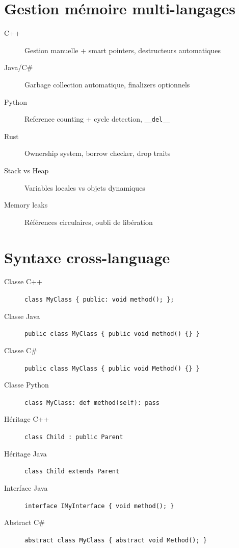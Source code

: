 \documentclass{article}
\begin{document}
\begin{multicols*}{3}
\section*{Gestion mémoire multi-langages}
\begin{description}
\item[C++] Gestion manuelle + smart pointers, destructeurs automatiques
\item[Java/C\#] Garbage collection automatique, finalizers optionnels
\item[Python] Reference counting + cycle detection, \texttt{\_\_del\_\_}
\item[Rust] Ownership system, borrow checker, drop traits
\item[Stack vs Heap] Variables locales vs objets dynamiques
\item[Memory leaks] Références circulaires, oubli de libération
\end{description}

\section*{Syntaxe cross-language}
\begin{description}
\item[Classe C++] \texttt{class MyClass \{ public: void method(); \};}
\item[Classe Java] \texttt{public class MyClass \{ public void method() \{\} \}}
\item[Classe C\#] \texttt{public class MyClass \{ public void Method() \{\} \}}
\item[Classe Python] \texttt{class MyClass: def method(self): pass}
\item[Héritage C++] \texttt{class Child : public Parent}
\item[Héritage Java] \texttt{class Child extends Parent}
\item[Interface Java] \texttt{interface IMyInterface \{ void method(); \}}
\item[Abstract C\#] \texttt{abstract class MyClass \{ abstract void Method(); \}}
\end{description}


\end{multicols*}
\end{document}
